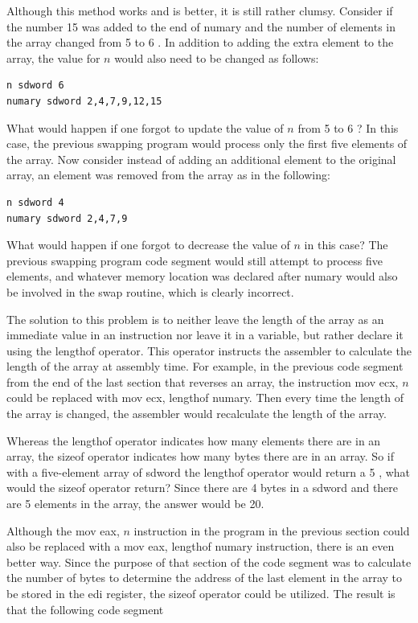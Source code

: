 \documentclass[10pt]{article}
\begin{document}
Although this method works and is better, it is still rather clumsy. Consider if the number 15 was added to the end of numary and the number of elements in the array changed from 5 to 6 . In addition to adding the extra element to the array, the value for $n$ would also need to be changed as follows:

\begin{verbatim}
n sdword 6
numary sdword 2,4,7,9,12,15
\end{verbatim}

What would happen if one forgot to update the value of $n$ from 5 to 6 ? In this case, the previous swapping program would process only the first five elements of the array. Now consider instead of adding an additional element to the original array, an element was removed from the array as in the following:

\begin{verbatim}
n sdword 4
numary sdword 2,4,7,9
\end{verbatim}

What would happen if one forgot to decrease the value of $n$ in this case? The previous swapping program code segment would still attempt to process five elements, and whatever memory location was declared after numary would also be involved in the swap routine, which is clearly incorrect.

The solution to this problem is to neither leave the length of the array as an immediate value in an instruction nor leave it in a variable, but rather declare it using the lengthof operator. This operator instructs the assembler to calculate the length of the array at assembly time. For example, in the previous code segment from the end of the last section that reverses an array, the instruction mov ecx, $n$ could be replaced with mov ecx, lengthof numary. Then every time the length of the array is changed, the assembler would recalculate the length of the array.

Whereas the lengthof operator indicates how many elements there are in an array, the sizeof operator indicates how many bytes there are in an array. So if with a five-element array of sdword the lengthof operator would return a 5 , what would the sizeof operator return? Since there are 4 bytes in a sdword and there are 5 elements in the array, the answer would be 20.

Although the mov eax, $n$ instruction in the program in the previous section could also be replaced with a mov eax, lengthof numary instruction, there is an even better way. Since the purpose of that section of the code segment was to calculate the number of bytes to determine the address of the last element in the array to be stored in the edi register, the sizeof operator could be utilized. The result is that the following code segment
\end{document}
